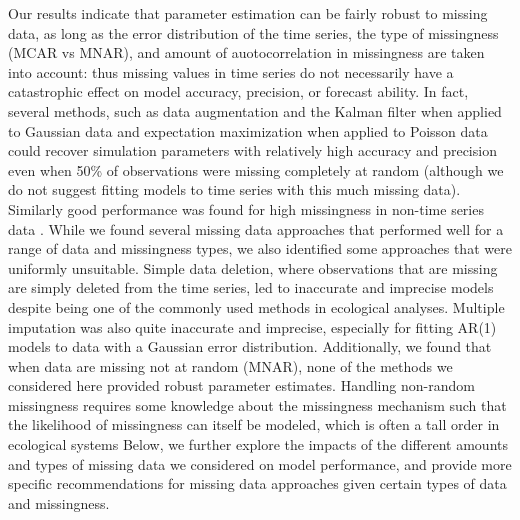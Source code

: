 \documentclass{article}
\begin{document}
Our results indicate that parameter estimation can be fairly robust to missing data, as long as the error distribution of the time series, the type of missingness (MCAR vs MNAR), and amount of auotocorrelation in missingness are taken into account: thus missing values in time series do not necessarily have a catastrophic effect on model accuracy, precision, or forecast ability. In fact, several methods, such as data augmentation and the Kalman filter when applied to Gaussian data and expectation maximization when applied to Poisson data could recover simulation parameters with relatively high accuracy and precision even when 50\% of observations were missing completely at random (although we do not suggest fitting models to time series with this much missing data). Similarly good performance was found for high missingness in non-time series data \citep{graham_missing_2009}. While we found several missing data approaches that performed well for a range of data and missingness types, we also identified some approaches that were uniformly unsuitable. Simple data deletion, where observations that are missing are simply deleted from the time series, led to inaccurate and imprecise models despite being one of the commonly used methods in ecological analyses. Multiple imputation was also quite inaccurate and imprecise, especially for fitting AR(1) %
models to data with a Gaussian error distribution. Additionally, we found that when data are missing not at random (MNAR), none of the methods we considered here provided robust parameter estimates. Handling non-random missingness requires some knowledge about the missingness mechanism such that the likelihood of missingness can itself be modeled, which is often a tall order in ecological systems  \citep[e.g.,][]{Sotto2011_mnar, McCall2014_mnar, Shoari2018_mnar} Below, we further explore the impacts of the different amounts and types of missing data we considered on model performance, and provide more specific recommendations for missing data approaches given certain types of data and missingness.
\end{document}
